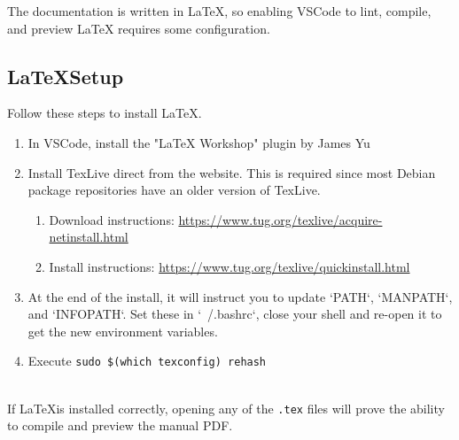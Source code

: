 The documentation is written in LaTeX, so enabling VSCode to lint, compile, and preview
LaTeX requires some configuration.

\subsection{\LaTeX\space Setup}

Follow these steps to install \LaTeX.

\begin{enumerate}
    \item In VSCode, install the "LaTeX Workshop" plugin by James Yu

    \item Install TexLive direct from the website.  This is required since
    most Debian package repositories have an older version of TexLive.
    \begin{enumerate}
        \item Download instructions: \href{https://www.tug.org/texlive/acquire-netinstall.html}{https://www.tug.org/texlive/acquire-netinstall.html}
        \item Install instructions: \href{https://www.tug.org/texlive/quickinstall.html}{https://www.tug.org/texlive/quickinstall.html}
    \end{enumerate}

    \item At the end of the install, it will instruct you to update `PATH`, `MANPATH`, and `INFOPATH`.
    Set these in `~/.bashrc`, close your shell and re-open it to get the new environment variables.

    \item Execute \texttt{sudo \$(which texconfig) rehash}

\end{enumerate}

\noindent\\If \LaTeX\space is installed correctly, opening any of the \texttt{.tex} files will prove the ability to
compile and preview the manual PDF.
